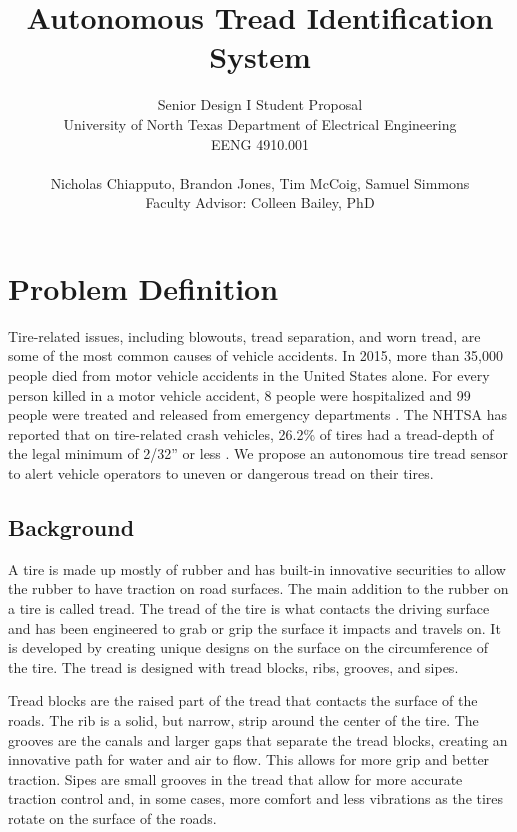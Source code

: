 \documentclass[11pt]{IEEEtran}
\begin{document}
	\title{ Autonomous Tread Identification System }

	\author{	Senior Design I Student Proposal \\
				University of North Texas Department of Electrical Engineering \\
				EENG 4910.001 \\ \\
				Nicholas Chiapputo, Brandon Jones, Tim McCoig, Samuel Simmons \\
				Faculty Advisor: Colleen Bailey, PhD
	}

	\maketitle


	\section{Problem Definition}
		Tire-related issues, including blowouts, tread separation, and worn tread, are some of the most common causes of vehicle accidents. In 2015, more than 35,000 people died from motor vehicle accidents in the United States alone. For every person killed in a motor vehicle accident, 8 people were hospitalized and 99 people were treated and released from emergency departments \cite{cdcKeyStats}. The NHTSA has reported that on tire-related crash vehicles, 26.2\% of tires had a tread-depth of the legal minimum of 2/32'' or less \cite[pp.~8-9]{nhtsaCrashStats}. We propose an autonomous tire tread sensor to alert vehicle operators to uneven or dangerous tread on their tires.

		\subsection{Background}
			A tire is made up mostly of rubber and has built-in innovative securities to allow the rubber to have traction on road surfaces. The main addition to the rubber on a tire is called tread. The tread of the tire is what contacts the driving surface and has been engineered to grab or grip the surface it impacts and travels on. It is developed by creating unique designs on the surface on the circumference of the tire. The tread is designed with tread blocks, ribs, grooves, and sipes.

			Tread blocks are the raised part of the tread that contacts the surface of the roads. The rib is a solid, but narrow, strip around the center of the tire. The grooves are the canals and larger gaps that separate the tread blocks, creating an innovative path for water and air to flow. This allows for more grip and better traction. Sipes are small grooves in the tread that allow for more accurate traction control and, in some cases, more comfort and less vibrations as the tires rotate on the surface of the roads. 
\end{document}
